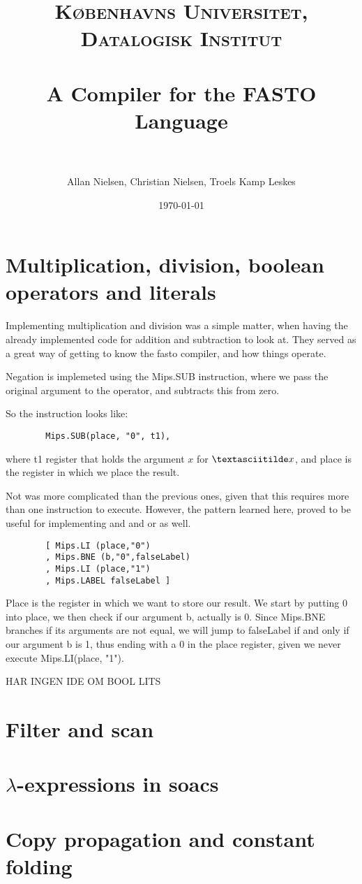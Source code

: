 \documentclass[paper=a4, fontsize=11pt]{scrartcl} %
\title{	
\normalfont \normalsize 
\textsc{Københavns Universitet, Datalogisk Institut} \\ [25pt] %
\horrule{0.5pt} \\[0.4cm] %
\huge A Compiler for the FASTO Language\\ %
\horrule{2pt} \\[0.5cm] %
}
\author{Allan Nielsen, Christian Nielsen, Troels Kamp Leskes} %
\date{\normalsize\today} %
\numberwithin{equation}{section} %
\numberwithin{figure}{section} %
\numberwithin{table}{section} %
\begin{document}
\maketitle %
\tableofcontents

\pagebreak


\section{Multiplication, division, boolean operators and literals}

	Implementing multiplication and division was a simple matter, when having the already implemented code for addition and subtraction to look at. They served as a great way of getting to know the fasto compiler, and how things operate.
	
	Negation is implemeted using the Mips.SUB instruction, where we pass the original argument to the operator, and subtracts this from zero.

	So the instruction looks like:
	\begin{verbatim}
		Mips.SUB(place, "0", t1),
	\end{verbatim}

	where t1 register that holds the argument $x$ for $\textasciitilde x$, and place is the register in which we place the result.

	Not was more complicated than the previous ones, given that this requires more than one instruction to execute. However, the pattern learned here, proved to be useful for implementing and and or as well.

	\begin{verbatim}
		[ Mips.LI (place,"0")
		, Mips.BNE (b,"0",falseLabel)
		, Mips.LI (place,"1")
		, Mips.LABEL falseLabel ]
    \end{verbatim}
    
    Place is the register in which we want to store our result. We start by putting 0 into place, we then check if our argument b, actually is 0. Since Mips.BNE branches if its arguments are not equal, we will jump to falseLabel if and only if our argument b is 1, thus ending with a 0 in the place register, given we never execute Mips.LI(place, "1").

	\Large{HAR INGEN IDE OM BOOL LITS}

\section{Filter and scan}

\section{$\lambda$-expressions in soacs}

\section{Copy propagation and constant folding}
\end{document}
